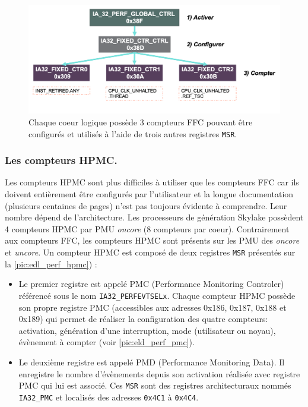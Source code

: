             \begin{figure}[ht!]
            \center
            \includegraphics[width=14cm]{images/edl_perf_ffc.png}
            \caption{\label{pic:edl_perf_ffc} Chaque coeur logique possède 3 compteurs FFC pouvant être configurés et utilisés à l'aide de trois autres registres \texttt{MSR}.}
            \end{figure}
        
            
        
       
        
        
        
        \subsubsection{Les compteurs HPMC.} 
            
            Les compteurs HPMC sont plus difficiles à utiliser que les compteurs FFC car ils doivent entièrement être configurés par l'utilisateur et la longue documentation (plusieurs centaines de pages) n'est pas toujours évidente à comprendre. Leur nombre dépend de l'architecture. Les processeurs de génération Skylake possèdent 4 compteurs HPMC par PMU \textit{oncore} (8 compteurs par coeur). Contrairement aux compteurs FFC, les compteurs HPMC sont présents sur les PMU des \textit{oncore} et \textit{uncore}. Un compteur HPMC est composé de deux registres \verb|MSR| présentés sur la  \autoref{pic:edl_perf_hpmc}) :
            \begin{itemize}
                \item Le premier registre est appelé PMC (Performance Monitoring Controler) référencé sous le nom \verb|IA32_PERFEVTSELx|. Chaque compteur HPMC possède son propre registre PMC (accessibles aux adresses 0x186, 0x187, 0x188 et 0x189) qui permet de réaliser la configuration des quatre compteurs: activation, génération d'une interruption, mode (utilisateur ou noyau), évènement à compter (voir \autoref{pic:eld_perf_pmc}). 
                \item Le deuxième registre est appelé PMD (Performance Monitoring Data). Il enregistre le nombre d'évènements depuis son activation réalisée avec registre PMC qui lui est associé. Ces \verb|MSR| sont des registres architecturaux nommés \verb|IA32_PMC| et localisés des adresses \verb|0x4C1| à \verb|0x4C4|.
                
            \end{itemize}
        
